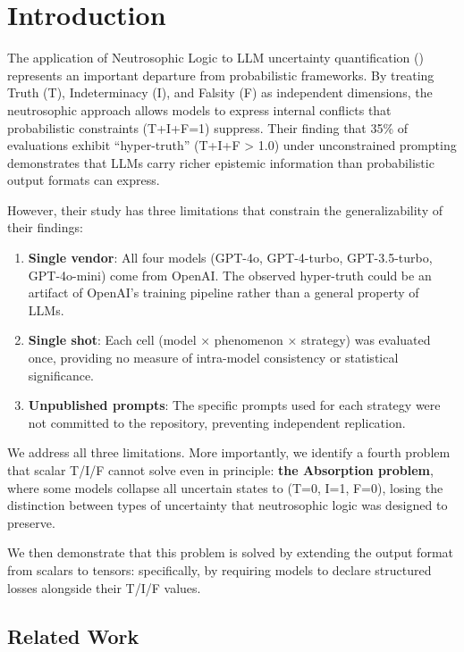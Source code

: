 \section{Introduction}

The application of Neutrosophic Logic to LLM uncertainty quantification
(\cite{leyva2025neutrosophic}) represents an important departure
from probabilistic frameworks. By treating Truth (T), Indeterminacy (I),
and Falsity (F) as independent dimensions, the neutrosophic approach
allows models to express internal conflicts that probabilistic
constraints (T+I+F=1) suppress. Their finding that 35\% of evaluations
exhibit ``hyper-truth'' (T+I+F > 1.0) under unconstrained
prompting demonstrates that LLMs carry richer epistemic information than
probabilistic output formats can express.

However, their study has three limitations that constrain the
generalizability of their findings:

\begin{enumerate}
\def\labelenumi{\arabic{enumi}.}
\item
  \textbf{Single vendor}: All four models (GPT-4o, GPT-4-turbo,
  GPT-3.5-turbo, GPT-4o-mini) come from OpenAI. The observed hyper-truth
  could be an artifact of OpenAI's training pipeline rather than a
  general property of LLMs.
\item
  \textbf{Single shot}: Each cell (model × phenomenon × strategy) was
  evaluated once, providing no measure of intra-model consistency or
  statistical significance.
\item
  \textbf{Unpublished prompts}: The specific prompts used for each
  strategy were not committed to the repository, preventing independent
  replication.
\end{enumerate}

We address all three limitations. More importantly, we identify a fourth
problem that scalar T/I/F cannot solve even in principle: \textbf{the
Absorption problem}, where some models collapse all uncertain states to
(T=0, I=1, F=0), losing the distinction between types of uncertainty
that neutrosophic logic was designed to preserve.

We then demonstrate that this problem is solved by extending the output
format from scalars to tensors: specifically, by requiring models to
declare structured losses alongside their T/I/F values.

\subsection{Related Work}

